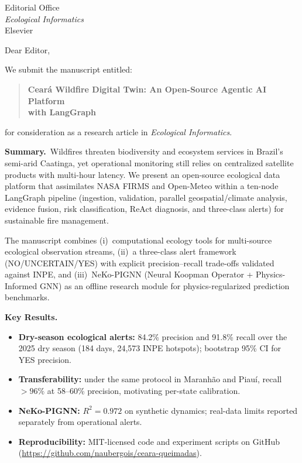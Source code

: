 \documentclass[a4paper,12pt]{letter}
\begin{document}
\begin{letter}{%
  Editorial Office\\
  \textit{Ecological Informatics}\\
  Elsevier
}

\opening{Dear Editor,}

We submit the manuscript entitled:

\begin{quote}
\textbf{Ceará Wildfire Digital Twin: An Open-Source Agentic AI Platform\\
with LangGraph}
\end{quote}

for consideration as a research article in \textit{Ecological Informatics}.

\medskip
\textbf{Summary.}\
Wildfires threaten biodiversity and ecosystem services in Brazil's semi-arid Caatinga, yet operational monitoring still relies on centralized satellite products with multi-hour latency. We present an open-source ecological data platform that assimilates NASA FIRMS and Open-Meteo within a ten-node LangGraph pipeline (ingestion, validation, parallel geospatial/climate analysis, evidence fusion, risk classification, ReAct diagnosis, and three-class alerts) for sustainable fire management.

The manuscript combines (i)~computational ecology tools for multi-source ecological observation streams, (ii)~a three-class alert framework (NO/UNCERTAIN/YES) with explicit precision--recall trade-offs validated against INPE, and (iii)~NeKo-PIGNN (Neural Koopman Operator + Physics-Informed GNN) as an offline research module for physics-regularized prediction benchmarks.

\medskip
\textbf{Key Results.}
\begin{itemize}
  \item \textbf{Dry-season ecological alerts:} 84.2\% precision and 91.8\% recall over the 2025 dry season (184 days, 24{,}573 INPE hotspots); bootstrap 95\% CI for YES precision.
  \item \textbf{Transferability:} under the same protocol in Maranhão and Piauí, recall $>96\%$ at 58--60\% precision, motivating per-state calibration.
  \item \textbf{NeKo-PIGNN:} $R^2=0.972$ on synthetic dynamics; real-data limits reported separately from operational alerts.
  \item \textbf{Reproducibility:} MIT-licensed code and experiment scripts on GitHub (\url{https://github.com/naubergois/ceara-queimadas}).
\end{itemize}


\end{letter}
\end{document}
